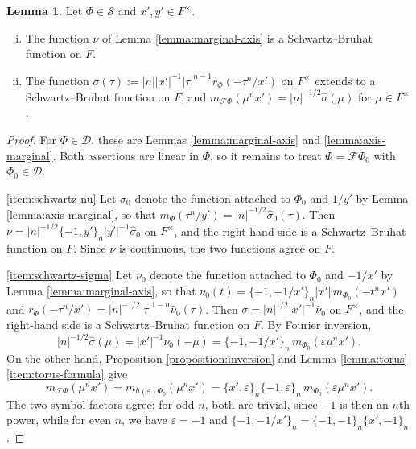 \documentclass[reqno]{amsart}
\theoremstyle{plain}
\theoremstyle{definition}
\theoremstyle{itplain}
\newtheorem{lemma}[theorem]{Lemma}
\numberwithin{equation}{section}
\numberwithin{theorem}{section}
\begin{document}
\begin{lemma}\label{lemma:schwartz-marginals}
  Let $\Phi \in \mathcal{S}$ and $x', y' \in F^\times$.
  \begin{enumerate}[(i)]
  \item\label{item:schwartz-nu} The function $\nu$ of Lemma \ref{lemma:marginal-axis} is a Schwartz--Bruhat function on $F$.
  \item\label{item:schwartz-sigma} The function $\sigma(\tau) := \lvert n \rvert \lvert x' \rvert^{-1} \lvert \tau \rvert^{n-1} r_\Phi(- \tau^n / x')$ on $F^\times$ extends to a Schwartz--Bruhat function on $F$, and $m_{\mathcal{F} \Phi}(\mu^n x') = \lvert n \rvert^{-1/2} \hat{\sigma}(\mu)$ for $\mu \in F^\times$.
  \end{enumerate}
\end{lemma}
\begin{proof}
  For $\Phi \in \mathcal{D}$, these are Lemmas \ref{lemma:marginal-axis} and \ref{lemma:axis-marginal}.  Both assertions are linear in $\Phi$, so it remains to treat $\Phi = \mathcal{F} \Phi_0$ with $\Phi_0 \in \mathcal{D}$.

  \eqref{item:schwartz-nu} Let $\sigma_0$ denote the function attached to $\Phi_0$ and $1 / y'$ by Lemma \ref{lemma:axis-marginal}, so that $m_\Phi(\tau^n / y') = \lvert n \rvert^{-1/2} \hat{\sigma}_0(\tau)$.  Then $\nu = \lvert n \rvert^{-1/2} \{-1, y'\}_n \lvert y' \rvert^{-1} \hat{\sigma}_0$ on $F^\times$, and the right-hand side is a Schwartz--Bruhat function on $F$.  Since $\nu$ is continuous, the two functions agree on $F$.

  \eqref{item:schwartz-sigma} Let $\nu_0$ denote the function attached to $\Phi_0$ and $-1/x'$ by Lemma \ref{lemma:marginal-axis}, so that $\nu_0(t) = \{-1, -1/x'\}_n \lvert x' \rvert \, m_{\Phi_0}(- t^n x')$ and $r_\Phi(- \tau^n / x') = \lvert n \rvert^{-1/2} \lvert \tau \rvert^{1-n} \hat{\nu}_0(\tau)$.  Then $\sigma = \lvert n \rvert^{1/2} \lvert x' \rvert^{-1} \hat{\nu}_0$ on $F^\times$, and the right-hand side is a Schwartz--Bruhat function on $F$.  By Fourier inversion,
  \begin{equation*}
    \lvert n \rvert^{-1/2} \hat{\sigma}(\mu) = \lvert x' \rvert^{-1} \nu_0(- \mu)
    = \{-1, -1/x'\}_n \, m_{\Phi_0}(\varepsilon \mu^n x').
  \end{equation*}
  On the other hand, Proposition \ref{proposition:inversion} and Lemma \ref{lemma:torus}\eqref{item:torus-formula} give
  \begin{equation*}
    m_{\mathcal{F} \Phi}(\mu^n x') = m_{h(\varepsilon) \Phi_0}(\mu^n x')
    = \{x', \varepsilon\}_n \{-1, \varepsilon\}_n \, m_{\Phi_0}(\varepsilon \mu^n x').
  \end{equation*}
  The two symbol factors agree: for odd $n$, both are trivial, since $-1$ is then an $n$th power, while for even $n$, we have $\varepsilon = -1$ and $\{-1, -1/x'\}_n = \{-1, -1\}_n \{x', -1\}_n$.
\end{proof}
\end{document}
